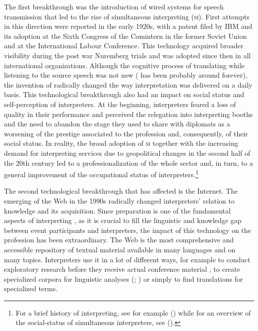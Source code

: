 \documentclass[output=paper]{langsci/langscibook}
\begin{document}
The first breakthrough was the introduction of wired systems for speech transmission that led to the rise of simultaneous interpreting (\textsc{si}). First attempts in this direction were reported in the early 1920s, with a patent filed by IBM and its adoption at the Sixth Congress of the Comintern in the former Soviet Union and at the International Labour Conference. This technology acquired broader visibility during the post war Nuremberg trials and was adopted since then in all international organizations. Although the cognitive process of translating while listening to the source speech was not new ( has been probably around forever), the invention of   radically changed the way interpretation was delivered on a daily basis. This technological breakthrough also had an impact on social status and self-perception of interpreters. At the beginning, interpreters feared a loss of quality in their performance and perceived the relegation into interpreting booths and the need to abandon the stage they used to share with diplomats as a worsening of the prestige associated to the profession and, consequently, of their social status. In reality, the broad adoption of \textsc{si} together with the increasing demand for interpreting services due to geopolitical changes in the second half of the 20th century led to a professionalization of the whole sector and, in turn, to a general improvement of the occupational status of interpreters.\footnote{For a brief history of interpreting, see for example \citeauthor{takeda_new_2016} (\citeyear{takeda_new_2016}) while for an overview of the social-status of simultaneous interpreters, see \citeauthor{Gentile2013} (\citeyear{Gentile2013}).} 
 
The second technological breakthrough that has affected  is the Internet. The emerging of the Web in the 1990s radically changed interpreters’ relation to knowledge and its acquisition. Since preparation is one of the fundamental aspects of interpreting \citep{Gile2009}, as it is crucial to fill the linguistic and knowledge gap between event participants and interpreters, the impact of this technology on the profession has been extraordinary. The Web is the most comprehensive and accessible repository of textual material available in many languages and on many topics. Interpreters use it in a lot of different ways, for example to conduct exploratory research before they receive actual conference material \citep{chang_conference_2018}, to create specialized corpora for linguistic analyses (\citealt{Fantinuoli2017a,Fantinuoli2018c}; \citealt{xu_corpus-based_2018}) or simply to find translations for specialized terms.\largerpage[-1]
\end{document}
